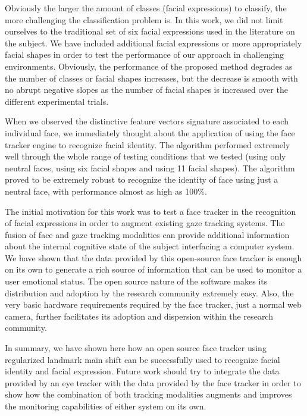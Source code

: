 \documentclass[]{article}
\begin{document}
Obviously the larger the amount of classes (facial expressions) to classify, the more challenging the
classification problem is. In this work, we did not limit ourselves to the traditional set  of six facial expressions
used in the literature on the subject. We have included additional facial expressions or more appropriately facial
shapes in order to test the performance of our approach in challenging environments. Obviously, the performance of the
proposed method degrades as the number of classes  or facial shapes increases, but the decrease is smooth with no abrupt
negative slopes as the number of facial shapes is increased over the different experimental trials.


When we observed the distinctive feature vectors signature associated to each individual face, we immediately thought
about the application of using the face tracker engine to recognize facial identity. The algorithm performed extremely
well  through the whole range of testing conditions that we tested (using only neutral faces, using six facial
shapes and using 11 facial shapes). The algorithm proved to be extremely robust to recognize the identity of face using
just a neutral face, with performance almost as high as 100\%.

The initial motivation for this work was to test a face tracker in the recognition of facial expressions in order to
augment existing gaze tracking systems. The fusion of face and gaze tracking modalities can provide additional
information about the internal cognitive state of the subject interfacing a computer system. We have shown that the data
provided by this open-source face tracker is enough on its own to generate a rich source of information that can be
used to monitor a user emotional status. The open source nature of the software makes its distribution and adoption by
the research community extremely easy. Also, the very basic hardware requirements required by the face tracker, just a normal web
camera, further facilitates its adoption and dispersion within the research community.


In summary, we have shown here how an open source face tracker using regularized landmark main shift can be successfully
used to recognize facial identity and facial expression. Future work should try to integrate the data provided by an
eye tracker with the data provided by the face tracker in order to show how the combination of both tracking modalities
augments and improves the monitoring capabilities of either system on its own.





\end{document}
